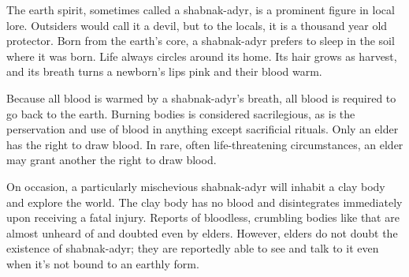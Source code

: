 \documentclass[blue]{guildcamp4}
\begin{document}
\name{\bShabnakAdyr{}}

The earth spirit, sometimes called a shabnak-adyr, is a prominent figure in local lore. Outsiders would call it a devil, but to the locals, it is a thousand year old protector. Born from the earth's core, a shabnak-adyr prefers to sleep in the soil where it was born. Life always circles around its home. Its hair grows as harvest, and its breath turns a newborn's lips pink and their blood warm. 

Because all blood is warmed by a shabnak-adyr's breath, all blood is required to go back to the earth. Burning bodies is considered sacrilegious, as is the perservation and use of blood in anything except sacrificial rituals. Only an elder has the right to draw blood. In rare, often life-threatening circumstances, an elder may grant another the right to draw blood.

On occasion, a particularly mischevious shabnak-adyr will inhabit a clay body and explore the world. The clay body has no blood and disintegrates immediately upon receiving a fatal injury. Reports of bloodless, crumbling bodies like that are almost unheard of and doubted even by elders. However, elders do not doubt the existence of shabnak-adyr; they are reportedly able to see and talk to it even when it's not bound to an earthly form.   
\end{document}
